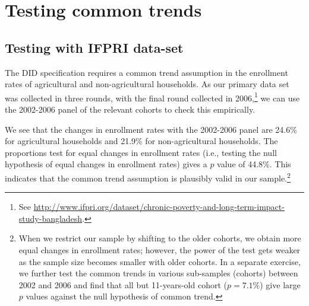 \documentclass[12pt,letterpaper]{article}
\newcommand{\0}{\ensuremath{\mbox{\boldmath $0$}}}
\begin{document}
\section{Testing common trends}

\subsection{Testing with IFPRI data-set}

The DID specification requires a common trend assumption in the enrollment rates of agricultural and non-agricultural households. As our primary data set was collected in three rounds, with the final round collected in 2006,\footnote{See \url{http://www.ifpri.org/dataset/chronic-poverty-and-long-term-impact-study-bangladesh}.} we can use the 2002-2006 panel of the relevant cohorts to check this empirically. 


We see that the changes in enrollment rates with the 2002-2006 panel are 24.6\% for agricultural households and 21.9\% for non-agricultural households. The proportions test for equal changes in enrollment rates (i.e., testing the null hypothesis of equal changes in enrollment rates) gives a $p$ value of 44.8\%.
This indicates that the common trend assumption is plausibly valid in our sample.\footnote{When we restrict our sample by shifting to the older cohorts, we obtain more equal changes in enrollment rates; however, the power of the test gets weaker as the sample size becomes smaller with older cohorts. In a separate exercise, we further test the common trends in various sub-samples (cohorts) between 2002 and 2006 and find that all but 11-years-old cohort ($p=7.1\%$) give large $p$ values against the null hypothesis of common trend.}

\end{document}
